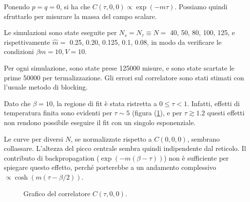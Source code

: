 \documentclass[a4paper,11pt]{article}
\begin{document}
    Ponendo $p = q = 0$, si ha che $C(\tau, 0, 0) \propto \exp (-m\tau)$. Possiamo quindi sfruttarlo per misurare la massa del campo scalare.
    
    Le simulazioni sono state eseguite per $N_s = N_\tau \equiv N =$ 40, 50, 80, 100, 125, e rispettivamente $\hat{m} = $ 0.25, 0.20, 0.125, 0.1, 0.08, in modo da verificare le condizioni $\beta m = 10, V=10$.
    
    Per ogni simulazione, sono state prese 125000 misure, e sono state scartate le prime 50000 per termalizzazione. Gli errori sul correlatore sono stati stimati con l'usuale metodo di blocking.
    
    
    Dato che $\beta = 10$, la regione di fit è stata ristretta a $0 \leq \tau < 1$. Infatti, effetti di temperatura finita sono evidenti per $\tau \sim 5$ (figura (\ref{fig:mass_correlator_plot}), e per $\tau \gtrsim 1.2$ questi effetti non rendono possibile eseguire il fit con un singolo esponenziale.

    
    Le curve per diversi $N$, se normalizzate rispetto a $C(0, 0, 0)$, sembrano collassare. L'altezza del picco centrale sembra quindi indipendente dal reticolo. Il contributo di backpropagation ($\exp (-m (\beta - \tau))$) non è sufficiente per spiegare questo effetto, perché porterebbe a un andamento complessivo $\propto \cosh (m(\tau - \beta/2))$. 
   
    \begin{figure}[htb]
        \centering
        \caption{Grafico del correlatore $C(\tau, 0, 0)$.}
        \label{fig:mass_correlator_plot}
    \end{figure}
\end{document}

